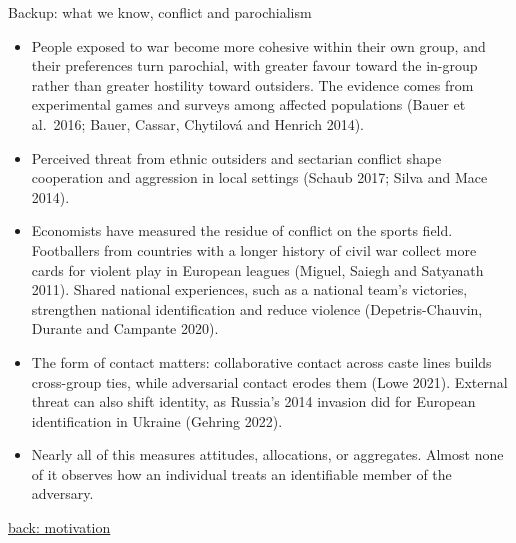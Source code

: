 \documentclass[aspectratio=169,11pt,t]{beamer}
\newcommand{\backto}[2]{\vfill\hfill\hyperlink{#1}{\textcolor{linkblue}{\scriptsize\textsf{back: #2}}}}
\begin{document}
\begin{frame}[label=bk-lit1]{Backup: what we know, conflict and parochialism}
  \footnotesize
  \begin{itemize}
    \item People exposed to war become more cohesive within their own group, and their preferences turn parochial, with greater favour toward the in-group rather than greater hostility toward outsiders. The evidence comes from experimental games and surveys among affected populations (Bauer et al.\ 2016; Bauer, Cassar, Chytilov\'a and Henrich 2014).
    \item Perceived threat from ethnic outsiders and sectarian conflict shape cooperation and aggression in local settings (Schaub 2017; Silva and Mace 2014).
    \item Economists have measured the residue of conflict on the sports field. Footballers from countries with a longer history of civil war collect more cards for violent play in European leagues (Miguel, Saiegh and Satyanath 2011). Shared national experiences, such as a national team's victories, strengthen national identification and reduce violence (Depetris-Chauvin, Durante and Campante 2020).
    \item The form of contact matters: collaborative contact across caste lines builds cross-group ties, while adversarial contact erodes them (Lowe 2021). External threat can also shift identity, as Russia's 2014 invasion did for European identification in Ukraine (Gehring 2022).
    \item Nearly all of this measures attitudes, allocations, or aggregates. Almost none of it observes how an individual treats an identifiable member of the adversary.
  \end{itemize}
  \backto{motivation}{motivation}
\end{frame}
\end{document}
